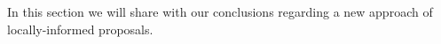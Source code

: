 In this section we will share with our conclusions regarding a new approach of locally-informed proposals.